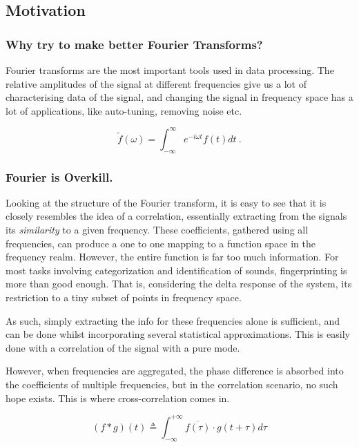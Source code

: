 \subsection{Motivation}




\subsubsection{Why try to make better Fourier Transforms?} Fourier transforms
are the most important tools used in data processing. The relative amplitudes of
the signal at different frequencies give us a lot of characterising data of the
signal, and changing the signal in frequency space has a lot of applications,
like auto-tuning, removing noise etc. \cite{wiki:fourier}

\begin{equation}
    \tilde{f}(\omega) = \int_{-\infty}^{\infty} e^{-i\omega t}f(t) dt~.
\end{equation}

\subsubsection{Fourier is Overkill.}
Looking at the structure of the Fourier transform, it is easy to see that it is
closely resembles the idea of a correlation, essentially extracting from the
signals its \emph{similarity} to a given frequency. These coefficients, gathered
using all frequencies, can produce a one to one mapping to a function space in
the frequency realm. However, the entire function is far too much information.
For most tasks involving categorization and identification of sounds,
fingerprinting is more than good enough. That is, considering the delta response
of the system, its restriction to a tiny subset of points in frequency space.

As such, simply extracting the info for these frequencies alone is sufficient,
and can be done whilst incorporating several statistical approximations. This is
easily done with a correlation of the signal with a pure mode. \cite{wiki:coranddep}

However, when frequencies are aggregated, the phase difference is absorbed into
the coefficients of multiple frequencies, but in the correlation scenario, no
such hope exists. This is where cross-correlation comes in. \cite{wiki:crosscor}

\begin{equation}
    (f \ast g)(t) \triangleq \int_{-\infty}^{+\infty} \overline{f(\tau)} \cdot g(t+\tau) d\tau
\end{equation}

